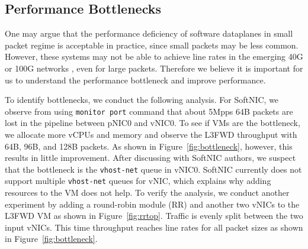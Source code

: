 









\subsection{Performance Bottlenecks}
\label{sec:cores}



One may argue that the performance deficiency of software dataplanes in small packet regime is acceptable in practice, since small packets may be less common. However, these systems may not be able to achieve line rates in the emerging 40G or 100G networks \cite{JYAV15}, even for large packets. Therefore we believe it is important for us to understand the performance bottleneck and improve performance. 


To identify bottlenecks, we conduct the following analysis. 
For SoftNIC, we observe from using {\tt monitor port} command that about 5Mpps 64B packets are lost in the pipeline between pNIC0 and vNIC0. 
To see if VMs are the bottleneck, we allocate more vCPUs and memory and observe the L3FWD throughput with 64B, 96B, and 128B packets. As shown in Figure~\ref{fig:bottleneck}, however, this results in little improvement. After discussing with SoftNIC authors, we suspect that the bottleneck is the {\tt vhost-net} queue in vNIC0. SoftNIC currently does not support multiple {\tt vhost-net} queues for vNIC, which explains why adding resources to the VM does not help. 
To verify the analysis, we conduct another experiment by adding a round-robin module (RR) and another two vNICs to the L3FWD VM as shown in Figure~\ref{fig:rrtop}. Traffic is evenly split between the two input vNICs. This time throughput reaches line rates for all packet sizes as shown in Figure~\ref{fig:bottleneck}. 

